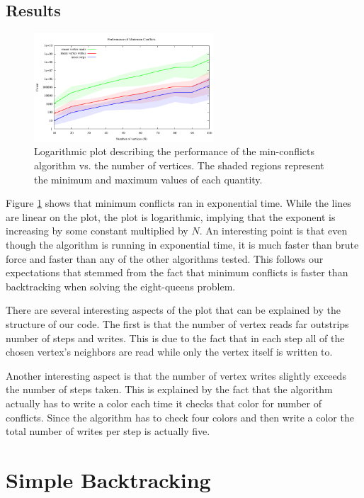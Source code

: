 \documentclass{article}
\begin{document}
	
	\subsection{Results}
	
			\begin{figure}[h!]
				\centering
				\includegraphics[width=0.6\textwidth]{../results_5/min_conflicts/min_conflicts_performance}
				\caption{Logarithmic plot describing the performance of the min-conflicts algorithm vs. the number of vertices. The shaded regions represent the minimum and maximum values of each quantity.}
				\label{minconf}
			\end{figure}
			
	 Figure \ref{minconf} shows  that minimum conflicts ran in exponential time. While the lines are linear on the plot, the plot is logarithmic, implying that the exponent is increasing by some constant multiplied by $N$. An interesting point is that even though the algorithm is running in exponential time, it is much faster than brute force and faster than any of the other algorithms tested. This follows our expectations that stemmed from the fact that minimum conflicts is faster than backtracking when solving the eight-queens problem\cite{MINTON}.
	
	There are several interesting aspects of the plot that can be explained by the structure of our code. The first is that the number of vertex reads far outstrips number of steps and writes. This is due to the fact that in each step all of the chosen vertex's neighbors are read while only the vertex itself is written to.
	
	Another interesting aspect is that the number of vertex writes slightly exceeds the number of steps taken. This is explained by the fact that the algorithm actually has to write a color each time it checks that color for number of conflicts. Since the algorithm has to check four colors and then write a color the total number of writes per step is actually five.

\section{Simple Backtracking}
\end{document}
